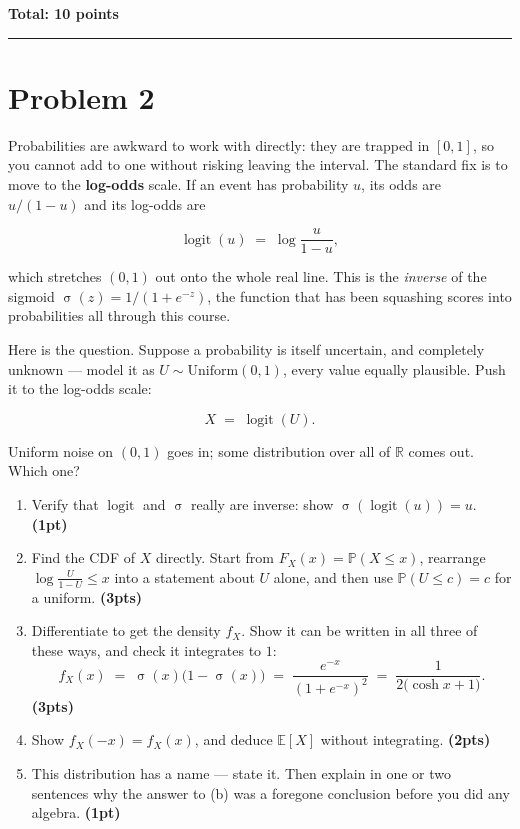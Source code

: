 \documentclass[11pt,a4paper]{article}
\newcommand{\pts}[1]{\hfill\textbf{(#1pts)}}
\newcommand{\pt}[1]{\hfill\textbf{(#1pt)}}
\newcommand{\total}[1]{\par\medskip\noindent\textbf{Total: #1 points}}
\newcommand{\PP}{\mathbb{P}}
\newcommand{\EE}{\mathbb{E}}
\newcommand{\sig}{\operatorname{\sigma}}
\newenvironment{parts}
  {\begin{enumerate}\setlength{\itemsep}{0.45em}\setlength{\parskip}{0pt}}
  {\end{enumerate}}
\begin{document}
\total{10}

\bigskip
\hrule
\bigskip

\section*{Problem 2}

Probabilities are awkward to work with directly: they are trapped in $[0,1]$, so
you cannot add to one without risking leaving the interval. The standard fix is
to move to the \textbf{log-odds} scale. If an event has probability $u$, its odds
are $u/(1-u)$ and its log-odds are

\[
  \operatorname{logit}(u) \;=\; \log\!\frac{u}{1-u},
\]

which stretches $(0,1)$ out onto the whole real line. This is the \emph{inverse}
of the sigmoid $\sig(z) = 1/(1+e^{-z})$, the function that has been squashing
scores into probabilities all through this course.

Here is the question. Suppose a probability is itself uncertain, and completely
unknown — model it as $U \sim \mathrm{Uniform}(0,1)$, every value equally
plausible. Push it to the log-odds scale:

\[
  X \;=\; \operatorname{logit}(U).
\]

Uniform noise on $(0,1)$ goes in; some distribution over all of $\mathbb{R}$
comes out. Which one?

\begin{parts}
  \item Verify that $\operatorname{logit}$ and $\sig$ really are inverse:
        show $\sig(\operatorname{logit}(u)) = u$. \pt{1}
  \item Find the CDF of $X$ directly. Start from $F_X(x) = \PP(X \le x)$,
        rearrange $\log\frac{U}{1-U} \le x$ into a statement about $U$ alone, and
        then use $\PP(U \le c) = c$ for a uniform. \pts{3}
  \item Differentiate to get the density $f_X$. Show it can be written in all
        three of these ways, and check it integrates to $1$:
        \[
          f_X(x) \;=\; \sig(x)\big(1 - \sig(x)\big)
                  \;=\; \frac{e^{-x}}{(1+e^{-x})^{2}}
                  \;=\; \frac{1}{2\big(\cosh x + 1\big)} .
        \]
        \pts{3}
  \item Show $f_X(-x) = f_X(x)$, and deduce $\EE[X]$ without integrating. \pts{2}
  \item This distribution has a name — state it. Then explain in one or two
        sentences why the answer to (b) was a foregone conclusion before you did
        any algebra. \pt{1}
\end{parts}
\end{document}
